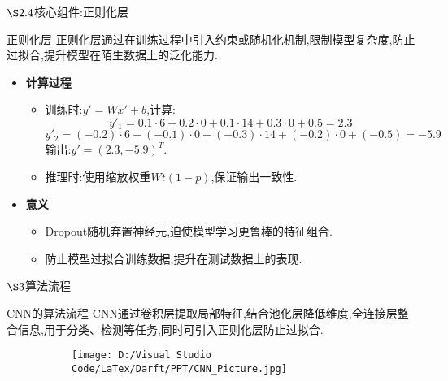 \documentclass{beamer}
\begin{document}
\begin{frame}{$\S2.4$核心组件:正则化层}
    \begin{block}{正则化层}
        正则化层通过在训练过程中引入约束或随机化机制,限制模型复杂度,防止过拟合,提升模型在陌生数据上的泛化能力.
    \end{block}
    \begin{itemize}
        \item \textbf{计算过程}
        \begin{itemize}
            \item 训练时:$y'=Wx'+b$,计算:
            \[
                y'_1=0.1\cdot 6+0.2\cdot 0+0.1\cdot 14+0.3\cdot 0+0.5=2.3
            \]
            \[
                y'_2=(-0.2)\cdot 6+(-0.1)\cdot 0+(-0.3)\cdot 14+(-0.2)\cdot 0+(-0.5)=-5.9
            \]
            输出:$y'=(2.3,-5.9)^T$.
            \item 推理时:使用缩放权重$Wt(1-p)$,保证输出一致性.
        \end{itemize}
        \item \textbf{意义}
        \begin{itemize}
            \item Dropout随机弃置神经元,迫使模型学习更鲁棒的特征组合.
            \item 防止模型过拟合训练数据,提升在测试数据上的表现.
        \end{itemize}
    \end{itemize}
\end{frame}

\begin{frame}{$\S3$算法流程}
    \begin{block}{CNN的算法流程}
        CNN通过卷积层提取局部特征,结合池化层降低维度,全连接层整合信息,用于分类、检测等任务,同时可引入正则化层防止过拟合.
    \end{block}
    \begin{figure}
        \centering
        \begin{subfigure}{1\textwidth}
            \centering
            \texttt{[image: D:/Visual Studio Code/LaTex/Darft/PPT/CNN\_Picture.jpg]}
        \end{subfigure}
    \end{figure}
\end{frame}
\end{document}

